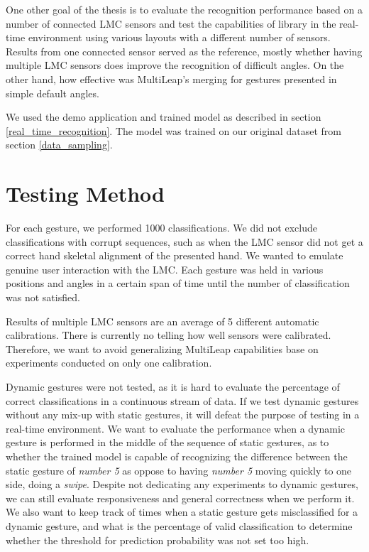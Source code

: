 
One other goal of the thesis is to evaluate the recognition performance based on a number of connected LMC sensors and test the capabilities of  library in the real-time environment using various layouts with a different number of sensors. Results from one connected sensor served as the reference, mostly whether having multiple LMC sensors does improve the recognition of difficult angles. On the other hand, how effective was MultiLeap's merging for gestures presented in simple default angles.

We used the demo application and trained model as described in section \ref{real_time_recognition}. The model was trained on our original dataset from section \ref{data_sampling}. 

\section{Testing Method}

For each gesture, we performed 1000 classifications. We did not exclude classifications with corrupt sequences, such as when the LMC sensor did not get a correct hand skeletal alignment of the presented hand. We wanted to emulate genuine user interaction with the LMC. Each gesture was held in various positions and angles in a certain span of time until the number of classification was not satisfied. 

Results of multiple LMC sensors are an average of 5 different automatic calibrations. There is currently no telling how well sensors were calibrated. Therefore, we want to avoid generalizing MultiLeap capabilities base on experiments conducted on only one calibration.

Dynamic gestures were not tested, as it is hard to evaluate the percentage of correct classifications in a continuous stream of data. If we test dynamic gestures without any mix-up with static gestures, it will defeat the purpose of testing in a real-time environment. We want to evaluate the performance when a dynamic gesture is performed in the middle of the sequence of static gestures, as to whether the trained model is capable of recognizing the difference between the static gesture of \textit{number 5} as oppose to having \textit{number 5} moving quickly to one side, doing a \textit{swipe}. Despite not dedicating any experiments to dynamic gestures, we can still evaluate responsiveness and general correctness when we perform it. We also want to keep track of times when a static gesture gets misclassified for a dynamic gesture, and what is the percentage of valid classification to determine whether the threshold for prediction probability was not set too high.


